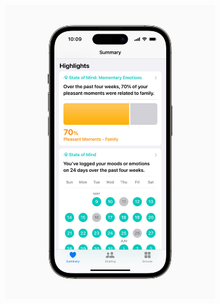         \begin{figure}[h]
            \begin{subfigure}[t]{0.49\textwidth}
                \includegraphics[width=1\linewidth]{figures/ios seguimiento bienestar emocional.jpg}
            \end{subfigure}
            \hfill
            \begin{subfigure}[t]{0.49\textwidth}

\end{subfigure}
\end{figure}
